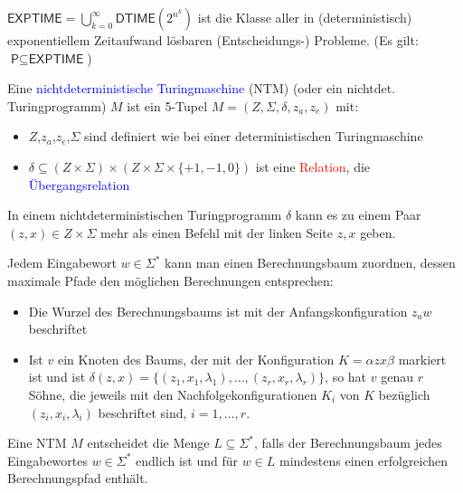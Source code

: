 \documentclass{scrreprt}
\begin{document}
\begin{Definition}
$\textsf{EXPTIME} = \bigcup\limits_{k=0}^\infty \textsf{DTIME}(2^{n^k})$ ist die Klasse aller in (deterministisch) exponentiellem Zeitaufwand lösbaren (Entscheidungs-) Probleme. (Es gilt: $\textsf{P}\subseteq \textsf{EXPTIME}$)
\end{Definition}

\begin{Definition}
Eine \textcolor{blue}{nichtdeterministische Turingmaschine} (NTM) (oder ein nichtdet. Turingprogramm) $M$ ist ein 5-Tupel $M=(Z,\Sigma,\delta,z_a,z_e)$ mit:
\begin{itemize}
\item $Z$,$z_a$,$z_e$,$\Sigma$ sind definiert wie bei einer deterministischen Turingmaschine
\item $\delta \subseteq (Z \times \Sigma) \times (Z \times \Sigma \times \{+1,-1,0\})$ ist eine \textcolor{red}{Relation}, die \textcolor{blue}{Übergangsrelation} 
\end{itemize}
In einem nichtdeterministischen Turingprogramm $\delta$ kann es zu einem Paar $(z,x)\in Z \times \Sigma$ mehr als einen Befehl mit der linken Seite $z,x$ geben.
\end{Definition}

\begin{Definition}
Jedem Eingabewort $w\in \Sigma^*$ kann man einen \glqq Berechnungsbaum \grqq zuordnen, dessen maximale Pfade den möglichen Berechnungen entsprechen:
\begin{itemize}
\item Die Wurzel des Berechnungsbaums ist mit der Anfangskonfiguration $z_a w$ beschriftet
\item Ist $v$ ein Knoten des Baums, der mit der Konfiguration $K = \alpha zx \beta$ markiert ist und ist $\delta(z,x) = \{ (z_1,x_1,\lambda_1),\ldots,(z_r,x_r,\lambda_r)\}$, so hat $v$ genau $r$ Söhne, die jeweils mit den Nachfolgekonfigurationen $K_i$ von $K$ bezüglich $(z_i,x_i,\lambda_i)$ beschriftet sind, $i=1,\ldots,r$.
\end{itemize}
\end{Definition}

\begin{Definition}
Eine NTM $M$ entscheidet die Menge $L\subseteq \Sigma^*$, falls der Berechnungsbaum jedes Eingabewortes $w\in \Sigma^*$ endlich ist und für $w\in L$ mindestens einen erfolgreichen Berechnungspfad enthält.
\end{Definition}
\end{document}
